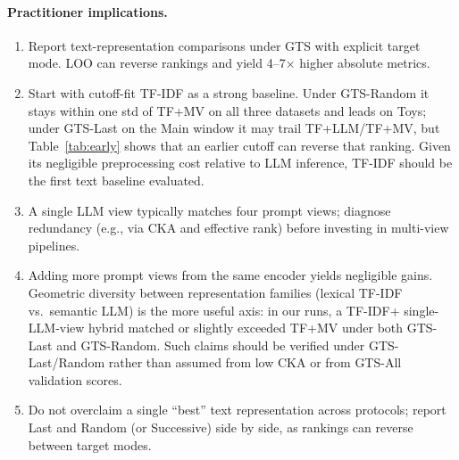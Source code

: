 \documentclass[sigconf,natbib=true,anonymous]{acmart}
\newcommand{\tfidf}{\textsc{TF-IDF}\xspace}
\newcommand{\llm}{\textsc{LLM}\xspace}
\newcommand{\tfllm}{\textsc{TF+LLM}\xspace}
\newcommand{\tfmv}{\textsc{TF+MV}\xspace}
\begin{document}
\paragraph{Practitioner implications.}
\begin{enumerate}[leftmargin=*,itemsep=2pt]
\item Report text-representation comparisons under GTS with explicit target mode.  LOO can reverse rankings and yield 4--7$\times$ higher absolute metrics.
\item Start with cutoff-fit \tfidf as a strong baseline.  Under GTS-Random it stays within one std of \tfmv on all three datasets and leads on Toys; under GTS-Last on the Main window it may trail \tfllm/\tfmv, but Table~\ref{tab:early} shows that an earlier cutoff can reverse that ranking.  Given its negligible preprocessing cost relative to LLM inference, TF-IDF should be the first text baseline evaluated.
\item A single \llm view typically matches four prompt views; diagnose redundancy (e.g., via CKA and effective rank) before investing in multi-view pipelines.
\item Adding more prompt views from the same encoder yields negligible gains.  Geometric diversity between representation families (lexical \tfidf vs.\ semantic \llm) is the more useful axis: in our runs, a \tfidf + single-LLM-view hybrid matched or slightly exceeded \tfmv under both GTS-Last and GTS-Random.  Such claims should be verified under GTS-Last/Random rather than assumed from low CKA or from GTS-All validation scores.
\item Do not overclaim a single ``best'' text representation across protocols; report Last and Random (or Successive) side by side, as rankings can reverse between target modes.
\end{enumerate}
\end{document}
